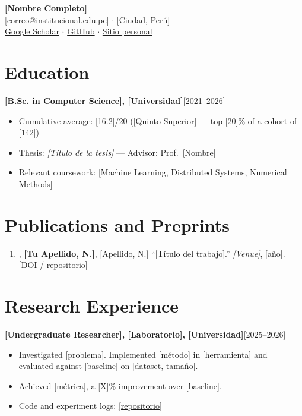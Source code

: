 \documentclass[11pt,letterpaper]{article}
\newcommand{\entry}[2]{\noindent\textbf{#1}\hfill #2\par}
\begin{document}
\begin{center}
  {\LARGE \textbf{[Nombre Completo]}}\\[0.4em]
  [correo@institucional.edu.pe] $\cdot$ [Ciudad, Perú]\\
  \href{[url-scholar]}{Google Scholar} $\cdot$
  \href{[url-github]}{GitHub} $\cdot$
  \href{[url-sitio]}{Sitio personal}
\end{center}

\section{Education}

\entry{[B.Sc. in Computer Science], [Universidad]}{[2021--2026]}
\begin{itemize}
  \item Cumulative average: [16.2]/20 ([Quinto Superior] --- top [20]\% of a cohort of [142])
  \item Thesis: \emph{[Título de la tesis]} --- Advisor: Prof.\ [Nombre]
  \item Relevant coursework: [Machine Learning, Distributed Systems, Numerical Methods]
\end{itemize}

\section{Publications and Preprints}
\begin{enumerate}[leftmargin=1.4em]
  \item [Apellido, N.], \textbf{[Tu Apellido, N.]}, [Apellido, N.]
        ``[Título del trabajo].'' \emph{[Venue]}, [año].
        \href{[doi-o-repo]}{[DOI / repositorio]}
\end{enumerate}

\section{Research Experience}

\entry{[Undergraduate Researcher], [Laboratorio], [Universidad]}{[2025--2026]}
\begin{itemize}
  \item Investigated [problema]. Implemented [método] in [herramienta] and
        evaluated against [baseline] on [dataset, tamaño].
  \item Achieved [métrica], a [X]\% improvement over [baseline].
  \item Code and experiment logs: \href{[url]}{[repositorio]}
\end{itemize}
\end{document}
